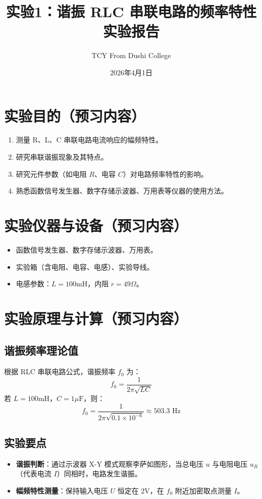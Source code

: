 \documentclass{article}
\title{实验1：谐振 RLC 串联电路的频率特性\\ \large 实验报告}
\author{TCY From Dushi College}
\date{2026年4月1日}
\begin{document}
\maketitle

\tableofcontents


\newpage


\section{实验目的（预习内容）}
\begin{enumerate}
    \item 测量 R、L、C 串联电路电流响应的幅频特性。
    \item 研究串联谐振现象及其特点。
    \item 研究元件参数（如电阻 $R$、电容 $C$）对电路频率特性的影响。
    \item 熟悉函数信号发生器、数字存储示波器、万用表等仪器的使用方法。
\end{enumerate}

\section{实验仪器与设备（预习内容）}
\begin{itemize}
    \item 函数信号发生器、数字存储示波器、万用表。
    \item 实验箱（含电阻、电容、电感）、实验导线。
    \item 电感参数：$L = 100\text{mH}$，内阻 $r = 49\Omega$。
\end{itemize}

\section{实验原理与计算（预习内容）}
\subsection{谐振频率理论值}
根据 RLC 串联电路公式，谐振频率 $f_0$ 为：
$$f_0 = \frac{1}{2\pi\sqrt{LC}}$$
若 $L = 100\text{mH}$，$C = 1\mu\text{F}$，则：
$$f_0 = \frac{1}{2\pi\sqrt{0.1 \times 10^{-6}}} \approx 503.3\text{ Hz}$$

\subsection{实验要点}
\begin{itemize}
    \item \textbf{谐振判断}：通过示波器 X-Y 模式观察李萨如图形，当总电压 $u$ 与电阻电压 $u_R$（代表电流 $I$）同相时，电路发生谐振。
    \item \textbf{幅频特性测量}：保持输入电压 $U$ 恒定在 $2\text{V}$，在 $f_0$ 附近加密取点测量 $I$。
\end{itemize}
\end{document}
